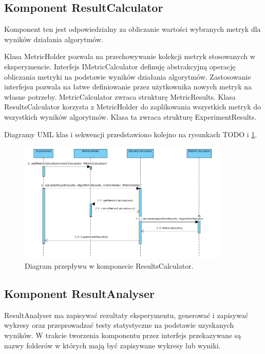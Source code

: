 \documentclass[12pt]{article}
\begin{document}
\subsection{Komponent ResultCalculator}

Komponent ten jest odpowiedzialny za obliczanie wartości wybranych metryk dla wyników działania algorytmów.

Klasa MetricHolder pozwala na przechowywanie kolekcji metryk stosowanych w eksperymencie. Interfejs IMetricCalculator definuję abstrakcyjną operację obliczania metryki na podstawie wyników działania algorytmów. Zastosowanie interfejsu pozwala na łatwe definiowanie przez użytkownika nowych metryk na własne potrzeby. MetricCalculator zwraca strukturę MetricResults. Klasa ResultsCalculator korzysta z MetricHolder do zaplikowania wszystkich metryk do wszystkich wyników algorytmów. Klasa ta zwraca strukturę ExperimentResults.


Diagramy UML klas i sekwencji przedstawiono kolejno na rysunkach TODO i \ref{fig:sequenceResultsCalculator}.

\begin{figure}
	\centering
	\includegraphics[width=0.9\textwidth]{img/sequenceResultsCalculator.png}
	\caption{Diagram przepływu w komponecie ResultsCalculator.}
	\label{fig:sequenceResultsCalculator}
\end{figure}

\subsection{Komponent ResultAnalyser}

ResultAnalyser ma zapisywać rezultaty eksperymentu, generować i zapisywać wykresy oraz przeprowadzać testy statystyczne na podstawie uzyskanych wyników. W trakcie tworzenia komponentu przez interfejs przekazywane są nazwy folderów w których mają być zapisywane wykresy lub wyniki. 
\end{document}
